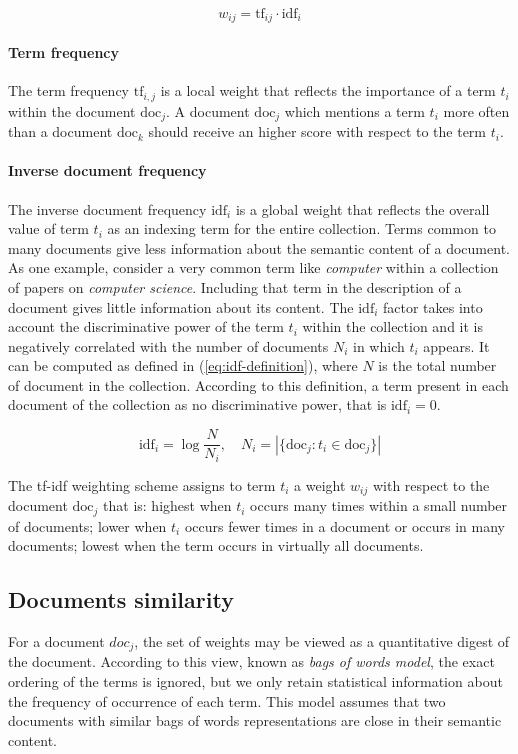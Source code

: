 \begin{equation}\label{eq:idf-wij_definition}
 w_{ij} = \mbox{tf}_{ij} \cdot \mbox{idf}_i
\end{equation}

\paragraph{Term frequency} The term frequency $\mbox{tf}_{i,j}$ is a local weight that reflects the importance of a term $t_i$ within the document $\mbox{doc}_j$. A document $\mbox{doc}_j$ which mentions a term $t_i$ more often than a document $\mbox{doc}_k$ should receive an higher score with respect to the term $t_i$.

\paragraph{Inverse document frequency} The inverse document frequency $\mbox{idf}_i$ is a global weight that reflects the overall value of term $t_i$ as an indexing term for the entire collection. Terms common to many documents give less information about the semantic content of a document. As one example, consider a very common term like \emph{computer} within a collection of papers on \emph{computer science}. Including that term in the description of a document gives little information about its content. The $\mbox{idf}_i$ factor takes into account the discriminative power of the term $t_i$ within the collection and it is negatively correlated with the number of documents $N_i$ in which $t_i$ appears. It can be computed as defined in (\ref{eq:idf-definition}), where $N$ is the total number of document in the collection. According to this definition, a term present in each document of the collection as no discriminative power, that is $\mbox{idf}_i = 0$.

\begin{equation}\label{eq:idf-definition}
 \mbox{idf}_i = \log\frac{N}{N_i}, \quad N_i =|\{\mbox{doc}_j : t_i \in \mbox{doc}_j\}|
\end{equation}

The tf-idf weighting scheme assigns to term $t_i$ a weight $w_{ij}$ with respect to the document $\mbox{doc}_j$ that is: highest when $t_i$ occurs many times within a small number of documents; lower when $t_i$ occurs fewer times in a document or occurs in many documents; lowest when the term occurs in virtually all documents.

\subsection{Documents similarity}
For a document $doc_j$, the set of weights may be viewed as a quantitative digest of the document. According to this view, known as \emph{bags of words model}, the exact ordering of the terms is ignored, but we only retain statistical information about the frequency of occurrence of each term. This model assumes that two documents with similar bags of words representations are close in their semantic content.

